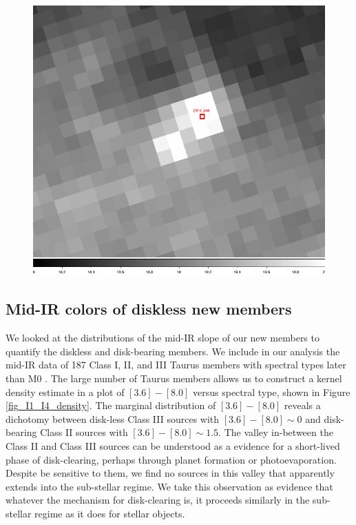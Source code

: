\documentclass[12pt,preprint]{aastex}
\begin{document}
\begin{figure}[ht!]
\begin{minipage}[b]{0.3\linewidth}
\end{minipage}
\hspace{0.5cm}
\begin{minipage}[b]{0.3\linewidth}
\centering
\includegraphics[scale=0.15]{figures/OPH_349_IRAC4_image}
\end{minipage}
\end{figure}

\subsection{Mid-IR colors of diskless new members}

We looked at the distributions of the mid-IR slope of our new members to quantify the diskless and disk-bearing members.  We include in our analysis the mid-IR data of 187 Class I, II, and III Taurus members with spectral types later than M0 \citep{2010ApJS..186..111L}.  The large number of Taurus members allows us to construct a kernel density estimate in a plot of $[3.6]-[8.0]$ versus spectral type, shown in Figure \ref{fig_I1_I4_density}.  The marginal distribution of $[3.6]-[8.0]$ reveals a dichotomy between disk-less Class III sources with $[3.6]-[8.0] \sim 0$ and disk-bearing Class II sources with $[3.6]-[8.0] \sim 1.5$.  The valley in-between the Class II and Class III sources can be understood as a evidence for a short-lived phase of disk-clearing, perhaps through planet formation or photoevaporation.  Despite be sensitive to them, we find no sources in this valley that apparently extends into the sub-stellar regime.  We take this observation as evidence that whatever the mechanism for disk-clearing is, it proceeds similarly in the sub-stellar regime as it does for stellar objects.  
\end{document}
